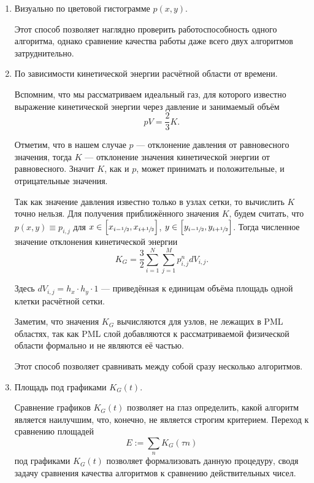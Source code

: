\begin{enumerate}
    \item Визуально по цветовой гистограмме $p(x,y)$. 
    
    Этот способ позволяет наглядно проверить работоспособность одного алгоритма, однако сравнение качества работы даже всего двух алгоритмов  затруднительно.
    
    \item По зависимости кинетической энергии расчётной области от времени.
    
    Вспомним, что мы рассматриваем идеальный газ, для которого известно выражение кинетической энергии через давление и занимаемый объём
    \begin{equation*}
        pV = \dfrac{2}{3} K .
    \end{equation*}
    
    Отметим, что в нашем случае $p$ --- отклонение давления от равновесного значения, тогда $K$ --- отклонение значения кинетической энергии от равновесного. Значит $K$, как и $p$, может принимать и положительные, и отрицательные значения.
    
    Так как значение давления известно только в узлах сетки, то вычислить $K$ точно нельзя. Для получения приближённого значения $K$, будем считать, что $p(x,y) \equiv p_{i,j}$ для $x \in \left[x_{i-\sfrac{1}{2}}, x_{i+\sfrac{1}{2}}\right]$, $y \in \left[y_{i-\sfrac{1}{2}}, y_{i+\sfrac{1}{2}}\right]$. Тогда численное значение отклонения кинетической энергии
    \begin{equation*}
        K_G = \dfrac{3}{2} \sum_{i=1}^N \sum_{j=1}^M p_{i,j}^n dV_{i,j}.
    \end{equation*}
    
    Здесь $dV_{i,j} = h_x \cdot h_y \cdot 1$ --- приведённая к единицам объёма площадь одной клетки расчётной сетки. 
    
    Заметим, что значения $K_G$ вычисляются для узлов, не лежащих в PML областях, так как PML слой добавляются к рассматриваемой физической области формально и не являются её частью.
    
    Этот способ позволяет сравнивать между собой сразу несколько алгоритмов.
    
    \item Площадь под графиками $K_G(t)$.
    
    Сравнение графиков $K_G(t)$ позволяет на глаз определить, какой алгоритм является наилучшим, что, конечно, не является строгим критерием. Переход к сравнению площадей
    \begin{equation}
        E := \sum_{n} K_G(\tau n)
        \label{eq:auc}
    \end{equation} 
    под графиками  $K_G(t)$ позволяет формализовать данную процедуру, сводя задачу сравнения качества алгоритмов к сравнению действительных чисел.
\end{enumerate}

